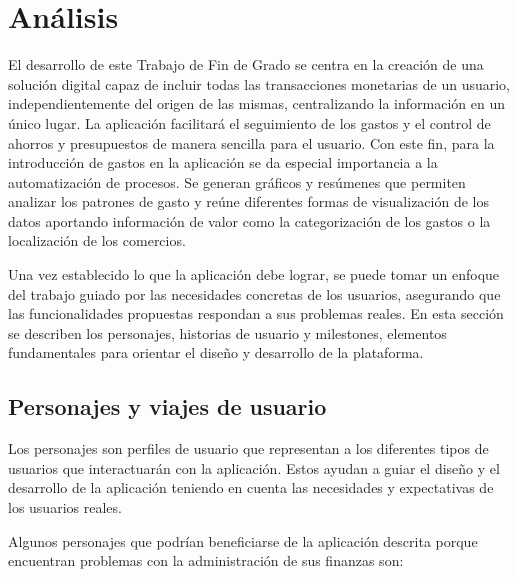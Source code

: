 \chapter{Análisis}

El desarrollo de este Trabajo de Fin de Grado se centra en la creación de una solución digital capaz de incluir todas las transacciones monetarias de un usuario, independientemente del origen de las mismas, centralizando la información en un único lugar. La aplicación facilitará el seguimiento de los gastos y el control de ahorros y presupuestos de manera sencilla para el usuario. Con este fin, para la introducción de gastos en la aplicación se da especial importancia a la automatización de procesos. Se generan gráficos y resúmenes que permiten analizar los patrones de gasto y reúne diferentes formas de visualización de los datos aportando información de valor como la categorización de los gastos o la localización de los comercios.

Una vez establecido lo que la aplicación debe lograr, se puede tomar un enfoque del trabajo guiado por las necesidades concretas de los usuarios, asegurando que las funcionalidades propuestas respondan a sus problemas reales. En esta sección se describen los personajes, historias de usuario y milestones, elementos fundamentales para orientar el diseño y desarrollo de la plataforma. 

\section{Personajes y viajes de usuario}
Los personajes son perfiles de usuario que representan a los diferentes tipos de usuarios que interactuarán con la aplicación. Estos ayudan a guiar el diseño y el desarrollo de la aplicación teniendo en cuenta las necesidades y expectativas de los usuarios reales.

Algunos personajes que podrían beneficiarse de la aplicación descrita porque encuentran problemas con la administración de sus finanzas son:

